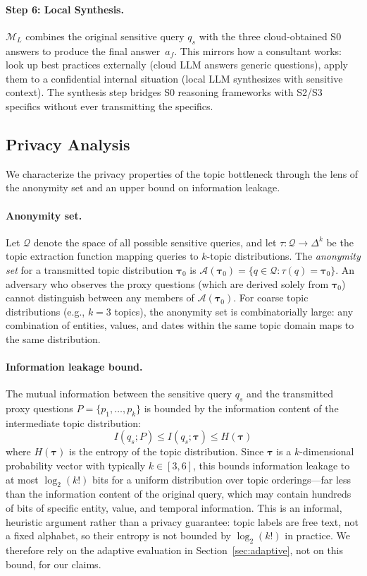\documentclass[sigconf,balance=false]{acmart}
\begin{document}
\paragraph{Step 6: Local Synthesis.} $\mathcal{M}_L$ combines the original sensitive query $q_s$ with the three cloud-obtained S0 answers to produce the final answer~$a_f$. This mirrors how a consultant works: look up best practices externally (cloud LLM answers generic questions), apply them to a confidential internal situation (local LLM synthesizes with sensitive context). The synthesis step bridges S0 reasoning frameworks with S2/S3 specifics without ever transmitting the specifics.

\subsection{Privacy Analysis}
\label{sec:privacy-analysis}

We characterize the privacy properties of the topic bottleneck through the lens of the anonymity set and an upper bound on information leakage.

\paragraph{Anonymity set.} Let $\mathcal{Q}$ denote the space of all possible sensitive queries, and let $\tau: \mathcal{Q} \to \Delta^k$ be the topic extraction function mapping queries to $k$-topic distributions. The \emph{anonymity set} for a transmitted topic distribution $\boldsymbol{\tau}_0$ is $\mathcal{A}(\boldsymbol{\tau}_0) = \{q \in \mathcal{Q} : \tau(q) = \boldsymbol{\tau}_0\}$. An adversary who observes the proxy questions (which are derived solely from $\boldsymbol{\tau}_0$) cannot distinguish between any members of $\mathcal{A}(\boldsymbol{\tau}_0)$. For coarse topic distributions (e.g., $k = 3$ topics), the anonymity set is combinatorially large: any combination of entities, values, and dates within the same topic domain maps to the same distribution.

\paragraph{Information leakage bound.} The mutual information between the sensitive query $q_s$ and the transmitted proxy questions $P = \{p_1, \ldots, p_k\}$ is bounded by the information content of the intermediate topic distribution:
\[
I(q_s; P) \leq I(q_s; \boldsymbol{\tau}) \leq H(\boldsymbol{\tau})
\]
where $H(\boldsymbol{\tau})$ is the entropy of the topic distribution. Since $\boldsymbol{\tau}$ is a $k$-dimensional probability vector with typically $k \in [3, 6]$, this bounds information leakage to at most $\log_2(k!)$ bits for a uniform distribution over topic orderings---far less than the information content of the original query, which may contain hundreds of bits of specific entity, value, and temporal information. This is an informal, heuristic argument rather than a privacy guarantee: topic labels are free text, not a fixed alphabet, so their entropy is not bounded by $\log_2(k!)$ in practice. We therefore rely on the adaptive evaluation in Section~\ref{sec:adaptive}, not on this bound, for our claims.
\end{document}
